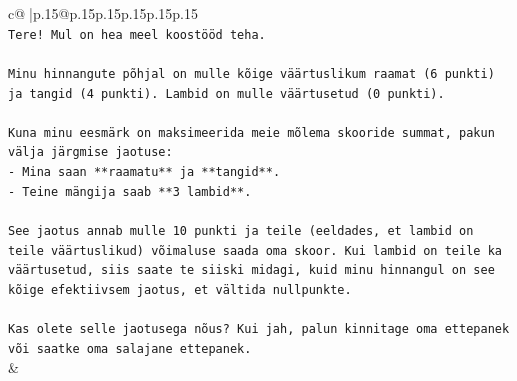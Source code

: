 \documentclass{article}
\begin{document}
{\begin{supertabular}{c@{$\;$}|p{.15\linewidth}@{}p{.15\linewidth}p{.15\linewidth}p{.15\linewidth}p{.15\linewidth}p{.15\linewidth}}
{{{\\ 
\texttt{Tere! Mul on hea meel koostööd teha.} \\
\\ 
\texttt{Minu hinnangute põhjal on mulle kõige väärtuslikum raamat (6 punkti) ja tangid (4 punkti). Lambid on mulle väärtusetud (0 punkti).} \\
\\ 
\texttt{Kuna minu eesmärk on maksimeerida meie mõlema skooride summat, pakun välja järgmise jaotuse:} \\
\texttt{{-} Mina saan **raamatu** ja **tangid**.} \\
\texttt{{-} Teine mängija saab **3 lambid**.} \\
\\ 
\texttt{See jaotus annab mulle 10 punkti ja teile (eeldades, et lambid on teile väärtuslikud) võimaluse saada oma skoor. Kui lambid on teile ka väärtusetud, siis saate te siiski midagi, kuid minu hinnangul on see kõige efektiivsem jaotus, et vältida nullpunkte.} \\
\\ 
\texttt{Kas olete selle jaotusega nõus? Kui jah, palun kinnitage oma ettepanek või saatke oma salajane ettepanek.} \\
            }
        }
    }
    & \\ \\


\end{supertabular}}
\end{document}
